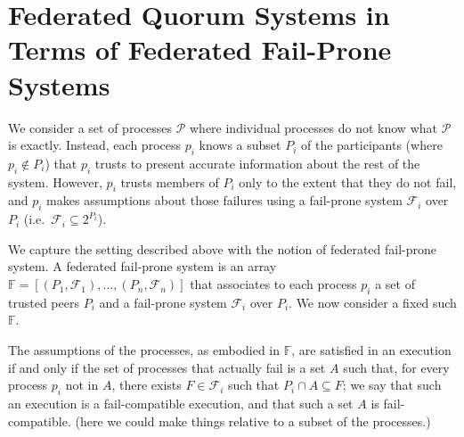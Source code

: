 \documentclass[11pt]{article}
\begin{document}


\section{Federated Quorum Systems in Terms of Federated Fail-Prone Systems}
\label{sec:basic}

We consider a set of processes $\mathcal{P}$ where individual processes do not know what $\mathcal{P}$ is exactly.
Instead, each process $p_i$ knows a subset $P_i$ of the participants (where $p_i\not\in P_i$) that $p_i$ trusts to present accurate information about the rest of the system.
However, $p_i$ trusts members of $P_i$ only to the extent that they do not fail, and $p_i$ makes assumptions about those failures using a fail-prone system $\mathcal{F}_i$ over $P_i$ (i.e.\ $\mathcal{F}_i\subseteq 2^{P_i}$).

We capture the setting described above with the notion of federated fail-prone system. A federated fail-prone system is an array $\mathbb{F}=\left[\left(P_1,\mathcal{F}_1\right),...,\left(P_n,\mathcal{F}_n\right)\right]$ that associates to each process $p_i$ a set of trusted peers $P_i$ and a fail-prone system $\mathcal{F}_i$ over $P_i$. %
We now consider a fixed such $\mathbb{F}$.

The assumptions of the processes, as embodied in $\mathbb{F}$, are satisfied in an execution if and only if the set of processes that actually fail is a set $A$ such that, for every process $p_i$ not in $A$, there exists $F\in\mathcal{F}_i$ such that $P_i\cap A \subseteq F$; we say that such an execution is a fail-compatible execution, and that such a set $A$ is fail-compatible.
{\color{red}(here we could make things relative to a subset of the processes.)}
\end{document}
